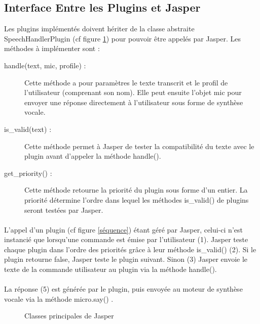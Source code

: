 \documentclass[12pt]{article}
\begin{document}
		\subsection{Interface Entre les Plugins et Jasper}
		Les plugins implémentés doivent hériter de la classe abstraite SpeechHandlerPlugin (cf figure \ref{classes}) pour pouvoir être appelés par Jasper. Les méthodes à implémenter sont :
		\begin{description}
			\item[handle(text, mic, profile) : ] Cette méthode a pour paramètres le texte transcrit et le profil de l'utilisateur (comprenant son nom). Elle peut ensuite l'objet mic pour envoyer une réponse directement à l'utilisateur sous forme de synthèse vocale.
			
			\item[is\_valid(text) : ] Cette méthode permet à Jasper de tester la compatibilité du texte avec le plugin avant d'appeler la méthode handle().
			
			\item[get\_priority() : ] Cette méthode retourne la priorité du plugin sous forme d'un entier. La priorité détermine l'ordre dans lequel les méthodes is\_valid() de plugins seront testées par Jasper.
		\end{description}
		
		\paragraph{}
		L'appel d'un plugin (cf figure \ref{séquence}) étant géré par Jasper, celui-ci n'est instancié que lorsqu'une commande est émise par l'utilisateur (1). Jasper teste chaque plugin dans l'ordre des priorités grâce à leur méthode is\_valid() (2). Si le plugin retourne false, Jasper teste le plugin suivant. Sinon (3) Jasper envoie le texte de la commande utilisateur au plugin via la méthode handle().
		
		\paragraph{}
		La réponse (5) est générée par le plugin, puis envoyée au moteur de synthèse vocale via la méthode micro.say() .
		
		\begin{figure}
			\centering
			\caption{\label{classes} Classes principales de Jasper}
		\end{figure}
	
\end{document}
